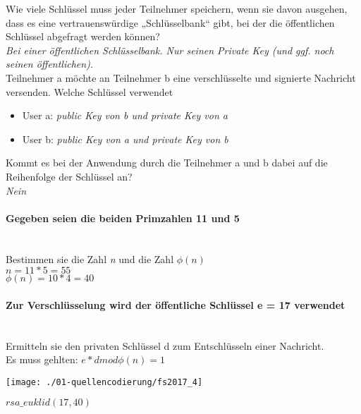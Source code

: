 Wie viele Schlüssel muss jeder Teilnehmer speichern, wenn sie davon ausgehen, dass es eine vertrauenswürdige „Schlüsselbank“ gibt, bei der die öffentlichen Schlüssel abgefragt werden können?\\
\textit{Bei einer öffentlichen Schlüsselbank. Nur seinen Private Key (und ggf. noch seinen öffentlichen).}\\

Teilnehmer a möchte an Teilnehmer b eine verschlüsselte und signierte Nachricht versenden. Welche Schlüssel verwendet
\begin{itemize}
    \item User a: \textit{public Key von b und private Key von a}
    \item User b: \textit{public Key von a und private Key von b}\\
\end{itemize}

Kommt es bei der Anwendung durch die Teilnehmer a und b dabei auf die Reihenfolge der Schlüssel an?\\
\textit{Nein}\\

\paragraph{Gegeben seien die beiden Primzahlen 11 und 5}\mbox{}\\
Bestimmen sie die Zahl \textit{n} und die Zahl $\phi(n)$\\
$n=11*5=55$\\
$\phi(n) = 10*4=40$

\paragraph{Zur Verschlüsselung wird der öffentliche Schlüssel e  = 17 verwendet}\mbox{}\\
Ermitteln sie den privaten Schlüssel d zum Entschlüsseln einer Nachricht.\\
Es muss gehlten: $e*dmod\phi(n)=1$\\

\begin{center}
    \vspace{-8pt}
    \texttt{[image: ./01-quellencodierung/fs2017\_4]}
    \vspace{-8pt}
\end{center}

$rsa\_euklid(17,40)$\\

